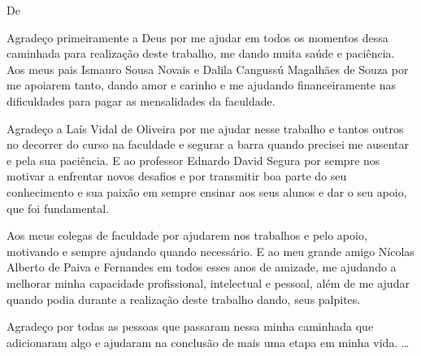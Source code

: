 \begin{agradecimentos}

De \imprimirAutorUm
\newline
\par Agradeço primeiramente a Deus por me ajudar em todos os momentos dessa caminhada para realização deste trabalho, me dando muita saúde e paciência.
Aos meus pais Ismauro Sousa Novais e Dalila Cangussú Magalhães de Souza por me apoiarem tanto, dando amor e carinho e me ajudando financeiramente nas dificuldades para pagar as mensalidades da faculdade.
\par Agradeço a Laís Vidal de Oliveira por me ajudar nesse trabalho e tantos outros no decorrer do curso na faculdade e segurar a barra quando precisei me ausentar e pela sua paciência.
E ao professor Ednardo David Segura  por sempre nos motivar a enfrentar novos desafios e por transmitir boa parte do seu conhecimento e sua paixão em sempre ensinar aos seus alunos e dar o seu apoio, que foi fundamental.
\par Aos meus colegas de faculdade por ajudarem nos trabalhos e pelo apoio, motivando e sempre ajudando quando necessário.
E ao meu grande amigo Nícolas Alberto de Paiva e Fernandes em todos esses anos de amizade, me ajudando a melhorar minha capacidade profissional, intelectual e pessoal, além de me ajudar quando podia durante a realização deste trabalho dando, seus palpites.
\par Agradeço por todas as pessoas que passaram nessa minha caminhada que adicionaram algo e ajudaram na conclusão de mais uma etapa em minha vida.
  \ldots \\



\end{agradecimentos}
